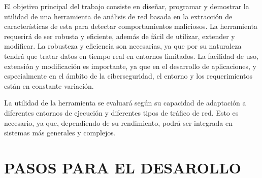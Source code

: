 El objetivo principal del trabajo consiste en diseñar, programar y demostrar la utilidad de una herramienta de análisis de red basada en la extracción de características de esta para detectar comportamientos maliciosos. La herramienta requerirá de ser robusta y eficiente, además de fácil de utilizar, extender y modificar. La robusteza y eficiencia son necesarias, ya que por su naturaleza tendrá que tratar datos en tiempo real en entornos limitados. La facilidad de uso, extensión y modificación es importante, ya que en el desarrollo de aplicaciones, y especialmente en el ámbito de la ciberseguridad, el entorno y los requerimientos están en constante variación.

La utilidad de la herramienta se evaluará según su capacidad de adaptación a diferentes entornos de ejecución y diferentes tipos de tráfico de red. Esto es necesario, ya que, dependiendo de su rendimiento, podrá ser integrada en sistemas más generales y complejos.

\section*{PASOS PARA EL DESAROLLO}

